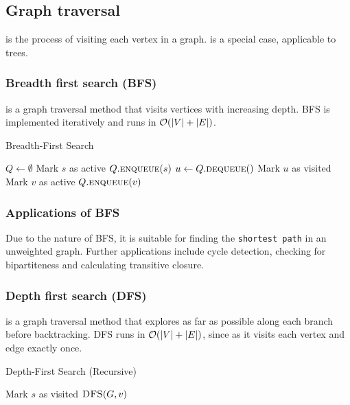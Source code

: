 \documentclass[a3paper, landscape, 11pt]{article} %
\begin{document}
\begin{multicols*}{4}
\hrulefill %

\subsection*{Graph traversal}
 is the process of visiting each vertex in a graph.  is a special case, applicable to trees.

\subsubsection*{Breadth first search (BFS)}

 is a graph traversal method that visits vertices with increasing depth. BFS is implemented iteratively and runs in $\mathcal{O}(|V|+|E|)$.

\begin{algorithm}[H]
\caption{Breadth-First Search}
\begin{algorithmic}[1]
\State $Q \gets \emptyset$
\State Mark $s$ as active
\State $Q.\textsc{enqueue}(s)$
\State $u \gets Q.\textsc{dequeue}()$
\State Mark $u$ as visited
\State Mark $v$ as active
\State $Q.\textsc{enqueue}(v)$
\EndIf
\EndFor
\EndWhile
\EndProcedure
\end{algorithmic}
\end{algorithm}

\subsubsection*{Applications of BFS}
Due to the nature of BFS, it is suitable for finding the \texttt{shortest path} in an unweighted graph. Further applications include cycle detection, checking for bipartiteness and calculating transitive closure.

\subsubsection*{Depth first search (DFS)}

 is a graph traversal method that explores as far as possible along each branch before backtracking. DFS runs in $\mathcal{O}(|V|+|E|)$, since as it visits each vertex and edge exactly once.

\begin{algorithm}[H]
\caption{Depth-First Search (Recursive)}
\begin{algorithmic}[1]
\State Mark $s$ as visited 
\State $\textsc{DFS}(G, v)$
\EndIf
\EndFor{}
\EndProcedure
\end{algorithmic}
\end{algorithm}


\end{multicols*}
\end{document}
